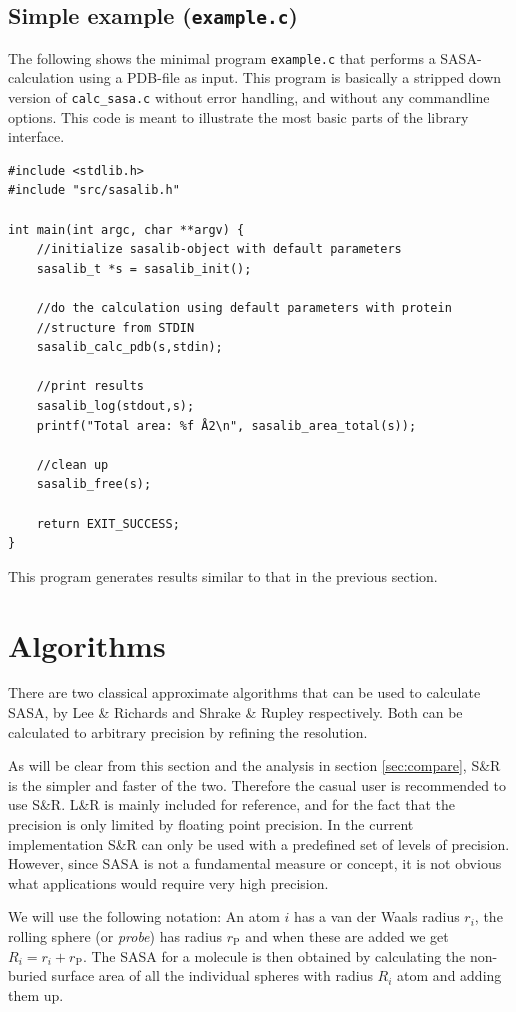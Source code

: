 \documentclass[a4paper,11pt]{article}
\begin{document}
\subsection{Simple example (\texttt{example.c})}\label{sec:simple_sample}

The following shows the minimal program \texttt{example.c} that
performs a SASA-calculation using a PDB-file as input. This program is
basically a stripped down version of \texttt{calc\_sasa.c} without
error handling, and without any commandline options. This code is
meant to illustrate the most basic parts of the library interface.
\begin{verbatim}
#include <stdlib.h>
#include "src/sasalib.h"

int main(int argc, char **argv) { 
    //initialize sasalib-object with default parameters
    sasalib_t *s = sasalib_init();

    //do the calculation using default parameters with protein
    //structure from STDIN
    sasalib_calc_pdb(s,stdin);

    //print results
    sasalib_log(stdout,s);
    printf("Total area: %f Å2\n", sasalib_area_total(s));

    //clean up
    sasalib_free(s);

    return EXIT_SUCCESS;
}
\end{verbatim}
This program generates results similar to that in the previous
section.

\section{Algorithms}\label{sec:alg}

There are two classical approximate algorithms that can be used to
calculate SASA, by Lee \& Richards \cite{LnR} and Shrake \& Rupley
\cite{SnR} respectively. Both can be calculated to arbitrary precision
by refining the resolution. 

As will be clear from this section and the analysis in section
\ref{sec:compare}, S\&R is the simpler and faster of the
two. Therefore the casual user is recommended to use S\&R. L\&R is
mainly included for reference, and for the fact that the precision is
only limited by floating point precision. In the current
implementation S\&R can only be used with a predefined set of levels
of precision. However, since SASA is not a fundamental measure or
concept, it is not obvious what applications would require very high
precision.

We will use the following notation: An atom $i$ has a van der Waals
radius $r_i$, the rolling sphere (or \emph{probe}) has radius
$r_\text{P}$ and when these are added we get $R_i = r_i +
r_\text{P}$. The SASA for a molecule is then obtained by calculating
the non-buried surface area of all the individual spheres with radius
$R_i$ atom and adding them up.
\end{document}
